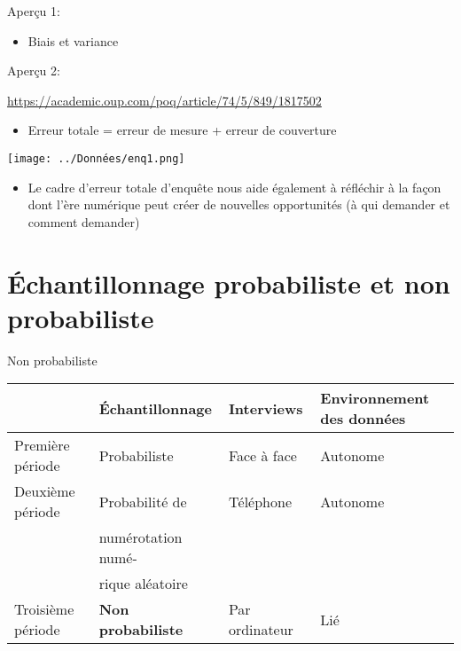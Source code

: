 \documentclass[
  ignorenonframetext,
]{beamer}
\providecommand{\tightlist}{%
  \setlength{\itemsep}{0pt}\setlength{\parskip}{0pt}}
\begin{document}
\begin{frame}{Aperçu 1:}
\protect\hypertarget{aperuxe7u-1}{}

\begin{itemize}
\tightlist
\item
  Biais et variance
\end{itemize}

\end{frame}

\begin{frame}{Aperçu 2:}
\protect\hypertarget{aperuxe7u-2}{}

\url{https://academic.oup.com/poq/article/74/5/849/1817502}

\begin{itemize}
\tightlist
\item
  Erreur totale = erreur de mesure + erreur de couverture
\end{itemize}

\texttt{[image: ../Données/enq1.png]}

\begin{itemize}
\tightlist
\item
  Le cadre d'erreur totale d'enquête nous aide également à réfléchir à
  la façon dont l'ère numérique peut créer de nouvelles opportunités (à
  qui demander et comment demander)
\end{itemize}

\end{frame}

\hypertarget{uxe9chantillonnage-probabiliste-et-non-probabiliste}{%
\section{Échantillonnage probabiliste et non
probabiliste}\label{uxe9chantillonnage-probabiliste-et-non-probabiliste}}

\begin{frame}{Non probabiliste}
\protect\hypertarget{non-probabiliste}{}

\begin{longtable}[]{@{}llll@{}}
\toprule
& Échantillonnage & Interviews & Environnement des
données\tabularnewline
\midrule
\endhead
Première période & Probabiliste & Face à face & Autonome\tabularnewline
Deuxième période & Probabilité de & Téléphone & Autonome\tabularnewline
& numérotation numé- & &\tabularnewline
& rique aléatoire & &\tabularnewline
Troisième période & \textbf{Non probabiliste} & Par ordinateur &
Lié\tabularnewline
\bottomrule
\end{longtable}

\end{frame}
\end{document}
